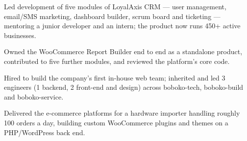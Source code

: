 \begin{CVbody}
{\small
\begin{itemlist}
    \item Led development of five modules of LoyalAxis CRM --- user management, email/SMS marketing, dashboard builder, scrum board and ticketing --- mentoring a junior developer and an intern; the product now runs 450+ active businesses.
    \item Owned the WooCommerce Report Builder end to end as a standalone product, contributed to five further modules, and reviewed the platform's core code.
\end{itemlist}}

\vspace{0.75em}

{\small
\begin{itemlist}
    \item Hired to build the company's first in-house web team; inherited and led 3 engineers (1 backend, 2 front-end and design) across boboko-tech, boboko-build and boboko-service.
    \item Delivered the e-commerce platforms for a hardware importer handling roughly 100 orders a day, building custom WooCommerce plugins and themes on a PHP/WordPress back end.
\end{itemlist}}


\end{CVbody}

